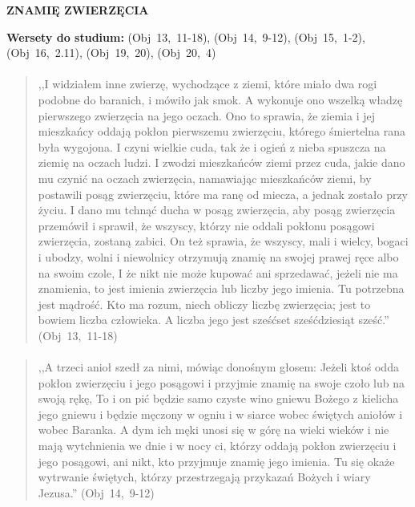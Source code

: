 \documentclass[10pt,a4paper,oneside]{article}
\begin{document}
\centerline{\textbf{\MakeUppercase{Znamię Zwierzęcia}}}
\begin{center}
\textbf{Wersety do studium:} 
\mbox{(Obj 13, 11-18)}, \mbox{(Obj 14, 9-12)}, \mbox{(Obj 15, 1-2)}, \mbox{(Obj 16, 2.11)}, \mbox{(Obj 19, 20)}, \mbox{(Obj 20, 4)}
\end{center}
\paragraph{}
\begin{quote}
,,I widziałem inne zwierzę, wychodzące z ziemi, które miało dwa rogi podobne do baranich, i mówiło jak smok. A wykonuje ono wszelką władzę pierwszego zwierzęcia na jego oczach. Ono to sprawia, że ziemia i jej mieszkańcy oddają pokłon pierwszemu zwierzęciu, którego śmiertelna rana była wygojona. I czyni wielkie cuda, tak że i ogień z nieba spuszcza na ziemię na oczach ludzi. I zwodzi mieszkańców ziemi przez cuda, jakie dano mu czynić na oczach zwierzęcia, namawiając mieszkańców ziemi, by postawili posąg zwierzęciu, które ma ranę od miecza, a jednak zostało przy życiu. I dano mu tchnąć ducha w posąg zwierzęcia, aby posąg zwierzęcia przemówił i sprawił, że wszyscy, którzy nie oddali pokłonu posągowi zwierzęcia, zostaną zabici. On też sprawia, że wszyscy, mali i wielcy, bogaci i ubodzy, wolni i niewolnicy otrzymują znamię na swojej prawej ręce albo na swoim czole, I że nikt nie może kupować ani sprzedawać, jeżeli nie ma znamienia, to jest imienia zwierzęcia lub liczby jego imienia. Tu potrzebna jest mądrość. Kto ma rozum, niech obliczy liczbę zwierzęcia; jest to bowiem liczba człowieka. A liczba jego jest sześćset sześćdziesiąt sześć.'' \mbox{(Obj 13, 11-18)}
\end{quote}
\paragraph{}
\begin{quote}
,,A trzeci anioł szedł za nimi, mówiąc donośnym głosem: Jeżeli ktoś odda pokłon zwierzęciu i jego posągowi i przyjmie znamię na swoje czoło lub na swoją rękę, To i on pić będzie samo czyste wino gniewu Bożego z kielicha jego gniewu i będzie męczony w ogniu i w siarce wobec świętych aniołów i wobec Baranka. A dym ich męki unosi się w górę na wieki wieków i nie mają wytchnienia we dnie i w nocy ci, którzy oddają pokłon zwierzęciu i jego posągowi, ani nikt, kto przyjmuje znamię jego imienia. Tu się okaże wytrwanie świętych, którzy przestrzegają przykazań Bożych i wiary Jezusa.'' \mbox{(Obj 14, 9-12)}
\end{quote}
\end{document}

